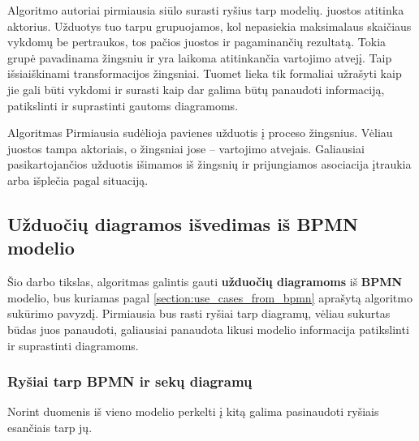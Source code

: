 \documentclass{VUMIFInfBakalaurinis}
\begin{document}
Algoritmo autoriai pirmiausia siūlo surasti ryšius tarp modelių. juostos atitinka aktorius. Užduotys tuo tarpu grupuojamos, kol nepasiekia maksimalaus skaičiaus vykdomų be pertraukos, tos pačios juostos ir pagaminančių rezultatą. Tokia grupė pavadinama žingsniu ir yra laikoma atitinkančia vartojimo atvejį. Taip  išsiaiškinami transformacijos žingsniai. Tuomet lieka tik formaliai užrašyti kaip jie gali būti vykdomi ir surasti kaip dar galima būtų panaudoti informaciją, patikslinti ir suprastinti gautoms diagramoms.

Algoritmas Pirmiausia sudėlioja pavienes užduotis į proceso žingsnius. Vėliau juostos tampa aktoriais, o žingsniai jose – vartojimo atvejais. Galiausiai pasikartojančios užduotis išimamos iš žingsnių ir prijungiamos asociacija įtraukia arba išplečia pagal situaciją.


\subsection{\textbf{Užduočių diagramos} išvedimas iš \textbf{BPMN} modelio}

Šio darbo tikslas, algoritmas galintis gauti \textbf{užduočių diagramoms} iš \textbf{BPMN} modelio, bus kuriamas pagal \ref{section:use_cases_from_bpmn} aprašytą algoritmo sukūrimo pavyzdį. Pirmiausia bus rasti ryšiai tarp diagramų, vėliau sukurtas būdas juos panaudoti, galiausiai panaudota likusi modelio informacija patikslinti ir suprastinti diagramoms.

\subsubsection{Ryšiai tarp \textbf{BPMN} ir \textbf{sekų diagramų}} \label{section:relations_sd_bpmn}

Norint duomenis iš vieno modelio perkelti į kitą galima pasinaudoti ryšiais esančiais tarp jų.
\end{document}
